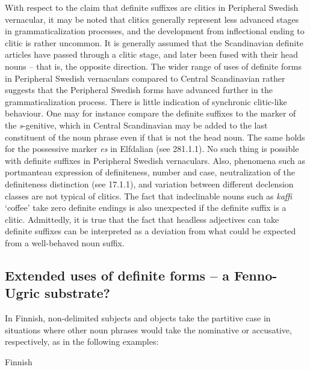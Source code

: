 \begin{styleBodytextC}
With respect to the claim that definite suffixes are clitics in Peripheral Swedish vernacular, it may be noted that clitics generally represent less advanced stages in grammaticalization processes, and the development from inflectional ending to clitic is rather uncommon. It is generally assumed that the Scandinavian definite articles have passed through a clitic stage, and later been fused with their head nouns – that is, the opposite direction. The wider range of uses of definite forms in Peripheral Swedish vernaculars compared to Central Scandinavian rather suggests that the Peripheral Swedish forms have advanced further in the grammaticalization process. There is little indication of synchronic clitic-like behaviour. One may for instance compare the definite suffixes to the marker of the \textit{s}{}-genitive, which in Central Scandinavian may be added to the last constituent of the noun phrase even if that is not the head noun. The same holds for the possessive marker \textit{es} in Elfdalian (see 281.1.1). No such thing is possible with definite suffixes in Peripheral Swedish vernaculars. Also, phenomena such as portmanteau expression of definiteness, number and case, neutralization of the definiteness distinction (see 17.1.1), and variation between different declension classes are not typical of clitics. The fact that indeclinable nouns such as \textit{kaffi} ‘coffee’ take zero definite endings is also unexpected if the definite suffix is a clitic. Admittedly, it is true that the fact that headless adjectives can take definite suffixes can be interpreted as a deviation from what could be expected from a well-behaved noun suffix.

\end{styleBodytextC}

\subsection{\rmfamily Extended uses of definite forms – a Fenno-Ugric substrate?}

\begin{styleBodyTextFirst}
In Finnish, non-delimited subjects and objects take the partitive case in situations where other noun phrases would take the nominative or accusative, respectively, as in the following examples:

\end{styleBodyTextFirst}

\begin{listWWNumileveli}
\item 

\begin{styleExample}
Finnish

\end{styleExample}

\end{listWWNumileveli}

